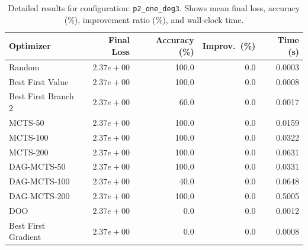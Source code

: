 \begin{table}[H]
\centering
\caption{Detailed results for configuration: \texttt{p2\_one\_deg3}. Shows mean final loss, accuracy (\%), improvement ratio (\%), and wall-clock time.}
\label{tab:funclearn-detail-5}
\begin{tabular}{lrrrr}
\toprule
Optimizer & Final Loss & Accuracy (\%) & Improv.~(\%) & Time (s) \\
\midrule
Random & \textbf{$2.37e+00$} & 100.0 & 0.0 & 0.0003 \\
\hline
Best First Value & \textbf{$2.37e+00$} & 100.0 & 0.0 & 0.0008 \\
\hline
Best First Branch 2 & \textbf{$2.37e+00$} & 60.0 & 0.0 & 0.0017 \\
\hline
MCTS-50 & \textbf{$2.37e+00$} & 100.0 & 0.0 & 0.0159 \\
\hline
MCTS-100 & \textbf{$2.37e+00$} & 100.0 & 0.0 & 0.0322 \\
\hline
MCTS-200 & \textbf{$2.37e+00$} & 100.0 & 0.0 & 0.0631 \\
\hline
DAG-MCTS-50 & \textbf{$2.37e+00$} & 100.0 & 0.0 & 0.0331 \\
\hline
DAG-MCTS-100 & \textbf{$2.37e+00$} & 40.0 & 0.0 & 0.0648 \\
\hline
DAG-MCTS-200 & \textbf{$2.37e+00$} & 100.0 & 0.0 & 0.5005 \\
\hline
DOO & \textbf{$2.37e+00$} & 0.0 & 0.0 & 0.0012 \\
\hline
Best First Gradient & \textbf{$2.37e+00$} & 0.0 & 0.0 & 0.0008 \\
\bottomrule
\end{tabular}
\end{table}

